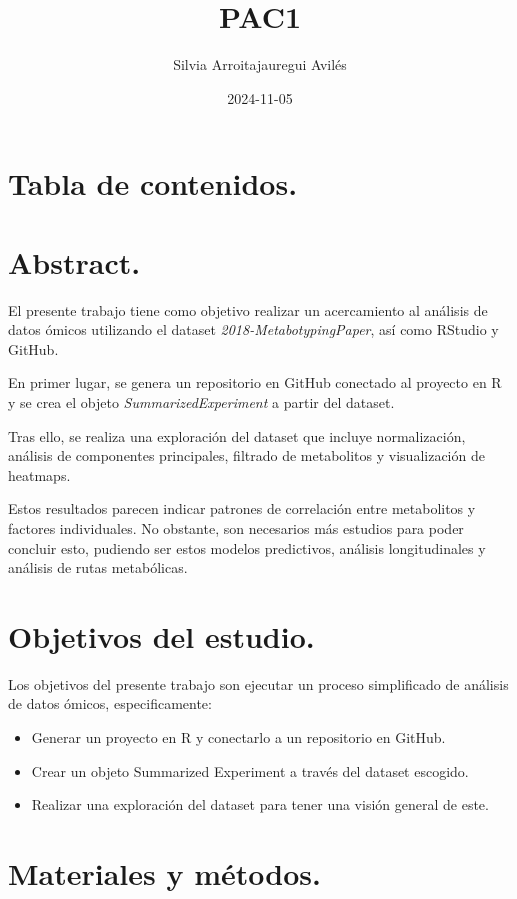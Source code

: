 \documentclass[
]{article}
\title{PAC1}
\author{Silvia Arroitajauregui Avilés}
\date{2024-11-05}
\begin{document}
\maketitle

\section{Tabla de contenidos.}\label{tabla-de-contenidos.}

\section{Abstract.}\label{abstract.}

El presente trabajo tiene como objetivo realizar un acercamiento al
análisis de datos ómicos utilizando el dataset
\emph{2018-MetabotypingPaper}, así como RStudio y GitHub.

En primer lugar, se genera un repositorio en GitHub conectado al
proyecto en R y se crea el objeto \emph{SummarizedExperiment} a partir
del dataset.

Tras ello, se realiza una exploración del dataset que incluye
normalización, análisis de componentes principales, filtrado de
metabolitos y visualización de heatmaps.

Estos resultados parecen indicar patrones de correlación entre
metabolitos y factores individuales. No obstante, son necesarios más
estudios para poder concluir esto, pudiendo ser estos modelos
predictivos, análisis longitudinales y análisis de rutas metabólicas.

\section{Objetivos del estudio.}\label{objetivos-del-estudio.}

Los objetivos del presente trabajo son ejecutar un proceso simplificado
de análisis de datos ómicos, especificamente:

\begin{itemize}
\item
  Generar un proyecto en R y conectarlo a un repositorio en GitHub.
\item
  Crear un objeto Summarized Experiment a través del dataset escogido.
\item
  Realizar una exploración del dataset para tener una visión general de
  este.
\end{itemize}

\section{Materiales y métodos.}\label{materiales-y-muxe9todos.}
\end{document}
